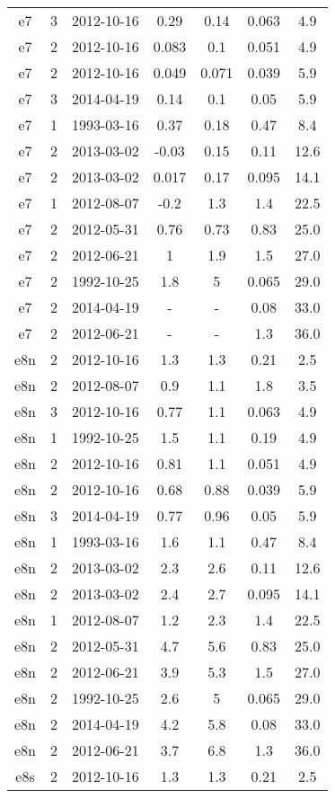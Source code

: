 \begin{table*}[htp]
\begin{tabular}{ccccccc}
e7 & 3 & 2012-10-16 & 0.29 & 0.14 & 0.063 & 4.9 \\
e7 & 2 & 2012-10-16 & 0.083 & 0.1 & 0.051 & 4.9 \\
e7 & 2 & 2012-10-16 & 0.049 & 0.071 & 0.039 & 5.9 \\
e7 & 3 & 2014-04-19 & 0.14 & 0.1 & 0.05 & 5.9 \\
e7 & 1 & 1993-03-16 & 0.37 & 0.18 & 0.47 & 8.4 \\
e7 & 2 & 2013-03-02 & -0.03 & 0.15 & 0.11 & 12.6 \\
e7 & 2 & 2013-03-02 & 0.017 & 0.17 & 0.095 & 14.1 \\
e7 & 1 & 2012-08-07 & -0.2 & 1.3 & 1.4 & 22.5 \\
e7 & 2 & 2012-05-31 & 0.76 & 0.73 & 0.83 & 25.0 \\
e7 & 2 & 2012-06-21 & 1 & 1.9 & 1.5 & 27.0 \\
e7 & 2 & 1992-10-25 & 1.8 & 5 & 0.065 & 29.0 \\
e7 & 2 & 2014-04-19 & - & - & 0.08 & 33.0 \\
e7 & 2 & 2012-06-21 & - & - & 1.3 & 36.0 \\
e8n & 2 & 2012-10-16 & 1.3 & 1.3 & 0.21 & 2.5 \\
e8n & 2 & 2012-08-07 & 0.9 & 1.1 & 1.8 & 3.5 \\
e8n & 3 & 2012-10-16 & 0.77 & 1.1 & 0.063 & 4.9 \\
e8n & 1 & 1992-10-25 & 1.5 & 1.1 & 0.19 & 4.9 \\
e8n & 2 & 2012-10-16 & 0.81 & 1.1 & 0.051 & 4.9 \\
e8n & 2 & 2012-10-16 & 0.68 & 0.88 & 0.039 & 5.9 \\
e8n & 3 & 2014-04-19 & 0.77 & 0.96 & 0.05 & 5.9 \\
e8n & 1 & 1993-03-16 & 1.6 & 1.1 & 0.47 & 8.4 \\
e8n & 2 & 2013-03-02 & 2.3 & 2.6 & 0.11 & 12.6 \\
e8n & 2 & 2013-03-02 & 2.4 & 2.7 & 0.095 & 14.1 \\
e8n & 1 & 2012-08-07 & 1.2 & 2.3 & 1.4 & 22.5 \\
e8n & 2 & 2012-05-31 & 4.7 & 5.6 & 0.83 & 25.0 \\
e8n & 2 & 2012-06-21 & 3.9 & 5.3 & 1.5 & 27.0 \\
e8n & 2 & 1992-10-25 & 2.6 & 5 & 0.065 & 29.0 \\
e8n & 2 & 2014-04-19 & 4.2 & 5.8 & 0.08 & 33.0 \\
e8n & 2 & 2012-06-21 & 3.7 & 6.8 & 1.3 & 36.0 \\
e8s & 2 & 2012-10-16 & 1.3 & 1.3 & 0.21 & 2.5 \\

\end{tabular}
\end{table*}
